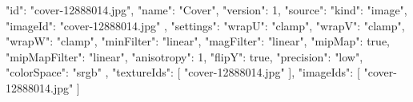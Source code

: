 {
  "id": "cover-12888014.jpg",
  "name": "Cover",
  "version": 1,
  "source": {
    "kind": "image",
    "imageId": "cover-12888014.jpg"
  },
  "settings": {
    "wrapU": "clamp",
    "wrapV": "clamp",
    "wrapW": "clamp",
    "minFilter": "linear",
    "magFilter": "linear",
    "mipMap": true,
    "mipMapFilter": "linear",
    "anisotropy": 1,
    "flipY": true,
    "precision": "low",
    "colorSpace": "srgb"
  },
  "textureIds": [
    "cover-12888014.jpg"
  ],
  "imageIds": [
    "cover-12888014.jpg"
  ]
}
